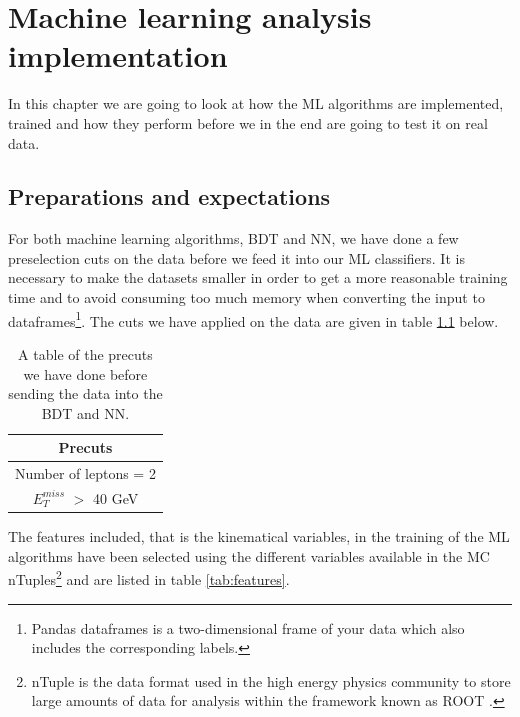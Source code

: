 \chapter{Machine learning analysis implementation}
\label{sec:MLanalysis}

In this chapter we are going to look at how the ML algorithms are implemented, trained and how they perform before we in the end are going to test it on real data. 

\section{Preparations and expectations}
For both machine learning algorithms, BDT and NN, we have done a few preselection cuts on the data before we feed it into our ML classifiers. It is necessary to make the datasets smaller in order to get a more reasonable training time and to avoid consuming too much memory when converting the input to dataframes\footnote{Pandas dataframes \cite{PD} is a two-dimensional frame of your data which also includes the corresponding labels.}. The cuts we have applied on the data are given in table \ref{tab:precutsSlepSlep} below.

\begin{table}[H]
    \centering
    \renewcommand{\arraystretch}{1.}
    \begin{tabular}{c}
    \toprule
    \textbf{Precuts}\\
    \midrule
    \midrule
        Number of leptons = 2 \\
        $E_T^{miss}$ $>$ 40 GeV\\
        \bottomrule
    \end{tabular}
    \caption{A table of the precuts we have done before sending the data into the BDT and NN.}
    \label{tab:precutsSlepSlep}
\end{table}

The features included, that is the kinematical variables, in the training of the ML algorithms have been selected using the different variables available in the MC nTuples\footnote{nTuple is the data format used in the high energy physics community to store large amounts of data for analysis within the framework known as ROOT \cite{root}.} and are listed in table \ref{tab:features}.

